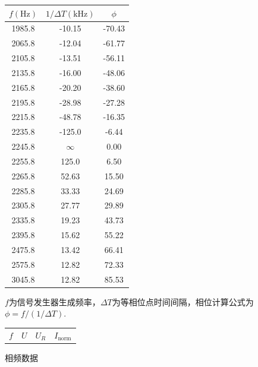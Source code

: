 \documentclass{ctexart}
\begin{document}
    \begin{figure}[p]
        \centering
        \begin{minipage}[t]{0.45\textwidth}
            \begin{tabular}{||c|c|c||}
                \hline
                $f(\mathrm{Hz})$ & $1/\Delta T(\mathrm{kHz})$ & $\phi$ \\
                \hline
                1985.8 & -10.15  & -70.43  \\
                2065.8 & -12.04  & -61.77  \\
                2105.8 & -13.51  & -56.11  \\
                2135.8 & -16.00  & -48.06  \\
                2165.8 & -20.20  & -38.60  \\
                2195.8 & -28.98  & -27.28  \\
                2215.8 & -48.78  & -16.35  \\
                2235.8 & -125.0  & -6.44  \\
                2245.8 & $\infty$  & 0.00  \\
                2255.8 & 125.0  & 6.50  \\
                2265.8 & 52.63  & 15.50  \\
                2285.8 & 33.33  & 24.69  \\
                2305.8 & 27.77  & 29.89  \\
                2335.8 & 19.23  & 43.73  \\
                2395.8 & 15.62  & 55.22  \\
                2475.8 & 13.42  & 66.41  \\
                2575.8 & 12.82  & 72.33  \\
                3045.8 & 12.82  & 85.53  \\
                \hline
            \end{tabular}%
            \captionsetup{type=table}
            \caption{相频数据}
            \quad $f$为信号发生器生成频率，$\Delta T$为等相位点时间间隔，相位计算公式为
            $\phi = f / (1/\Delta T)$.
        \end{minipage}
        \hfill
        \begin{minipage}[t]{0.45\textwidth}
            \begin{tabular}{||c|c|c|c||}
                \hline
                $f$ & $U$ & $U_R$ & $I_\textrm{norm}$ \\

\end{tabular}
\end{minipage}
\end{figure}
\end{document}
